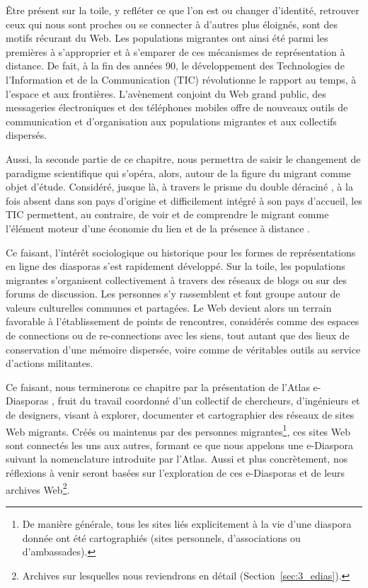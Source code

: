 \documentclass[symmetric,justified,marginals=raggedouter]{tufte-book}
\begin{document}
Être présent sur la toile, y refléter ce que l'on est ou changer d'iden\-tité, retrouver ceux qui nous sont proches ou se connecter à d'autres plus éloignés, sont des motifs récurant du Web. Les populations migrantes ont ainsi été parmi les premières à s'approprier et à s'emparer de ces mécanismes de représentation à distance. De fait, à la fin des années 90, le développement des Technologies de l'Information et de la Communication (TIC) révolutionne le rapport au temps, à l'espace et aux frontières. L'avènement conjoint du Web grand public, des messageries électroniques et des téléphones mobiles offre de nouveaux outils de communication et d'organisation aux populations migrantes et aux collectifs dispersés. 

Aussi, la seconde partie de ce chapitre, nous permettra de saisir le changement de paradigme scientifique qui s'opéra, alors, autour de la figure du migrant comme objet d'étude. Considéré, jusque là, à travers le prisme du double déraciné \citep{sayad_double_2000}, à la fois absent dans son pays d'origine et difficilement intégré à son pays d'accueil, les TIC permettent, au contraire, de voir et de comprendre le migrant comme l'élément moteur d'une économie du lien et de la présence à distance \citep{diminescu_connected_2008}. 

Ce faisant, l'intérêt sociologique ou historique pour les formes de représentations en ligne des diasporas s'est rapidement développé. Sur la toile, les populations migrantes s'organisent collectivement à travers des réseaux de blogs ou sur des forums de discussion. Les personnes s'y rassemblent et font groupe autour de valeurs culturelles communes et partagées. Le Web devient alors un terrain favorable à l'établissement de points de rencontres, considérés comme des espaces de connections ou de re-connections avec les siens, tout autant que des lieux de conservation d'une mémoire dispersée, voire comme de véritables outils au service d'actions militantes.

Ce faisant, nous terminerons ce chapitre par la présentation de l'Atlas e-Diasporas \citep{diminescu_e-diasporas_2012}, fruit du travail coordonné d'un collectif de cher\-cheurs, d'ingénieurs et de designers, visant à explorer, documenter et cartographier des réseaux de sites Web migrants. Créés ou maintenus par des personnes migrantes\footnote{\RaggedOuter De manière générale, tous les sites liés explicitement à la vie d'une diaspora donnée ont été cartographiés (sites personnels, d'associations ou d'ambassades).}, ces sites Web sont connectés les uns aux autres, formant ce que nous appelons une e-Diaspora suivant la nomenclature introduite par l'Atlas. Aussi et plus concrètement, nos réflexions à venir seront basées sur l'exploration de ces e-Diasporas et de leurs archives Web\footnote{\RaggedOuter Archives sur lesquelles nous reviendrons en détail (Section~\ref{sec:3_edias}).}.\\
\end{document}
